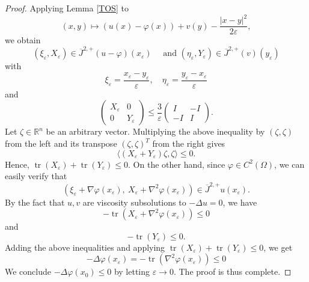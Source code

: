 \documentclass[10pt,a4paper]{amsart}
\DeclareMathOperator{\tr}{tr}
\def\vep{\varepsilon}
\newcommand{\Jop}{\overline{J}^{2,+}}
\begin{document}
\begin{proof}
Applying Lemma \ref{TOS} to 
\[
(x, y)\mapsto (u(x)-\varphi(x))+v(y)-\frac{|x-y|^2}{2\varepsilon},
\] 
we obtain %
\[
(\xi_\varepsilon, X_\varepsilon)\in \Jop(u-\varphi)(x_\varepsilon)\quad\text{ and } (\eta_\varepsilon, Y_\varepsilon)\in \Jop(v)(y_\varepsilon)\]
with
\[
\xi_\varepsilon=\frac{x_\varepsilon-y_\varepsilon}{\varepsilon}, \quad \eta_\varepsilon=\frac{y_\varepsilon-x_\varepsilon}{\varepsilon}
\]
and
\[
\begin{pmatrix}
X_\varepsilon & 0 \\
0 & Y_\varepsilon 
\end{pmatrix}\le \frac{3}{\varepsilon}\begin{pmatrix}
I & -I \\
-I & I 
\end{pmatrix}.
\]
Let $\zeta\in \mathbb{R}^n$ be an arbitrary vector. Multiplying the above inequality by $(\zeta, \zeta)$ from the left and its transpose $(\zeta, \zeta)^T$ from the right gives 
\begin{equation}\label{negH}
\langle(X_\varepsilon+Y_\varepsilon)\zeta, \zeta\rangle \le 0. 
\end{equation}
Hence, $\tr(X_\varepsilon)+\tr(Y_\varepsilon)\le 0.$
On the other hand, since $\varphi\in C^2(\Omega)$, we can easily verify that 
\[
(\xi_\varepsilon+\nabla \varphi(x_\varepsilon), \ X_\varepsilon+\nabla^2\varphi(x_\varepsilon))\in \Jop u(x_\varepsilon).
\]
By the fact that $u,v$ are viscosity subsolutions to $-\Delta u=0$, we have
\[
-\tr(X_\varepsilon+\nabla^2\varphi(x_\varepsilon))\le 0
\]
and 
\[
-\tr(Y_\varepsilon)\le 0.
\]
Adding the above inequalities and applying $\tr(X_\varepsilon)+\tr(Y_\varepsilon)\le 0$, we get
\[
-\Delta \varphi(x_\vep)=-\tr(\nabla^2\varphi(x_\varepsilon))\le 0
\]
 We conclude $-\Delta \varphi(x_0)\leq 0$ by letting $\varepsilon\to 0$. The proof is thus complete. 
\end{proof}
\end{document}
